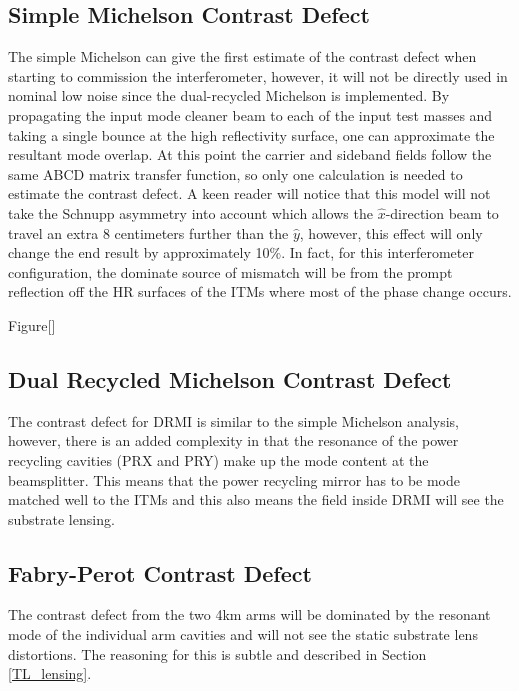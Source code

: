 	\subsection{Simple Michelson Contrast Defect}
	The simple Michelson can give the first estimate of the contrast defect when starting to commission the interferometer, however, it will not be directly used in nominal low noise since the dual-recycled Michelson is implemented.  
	By propagating the input mode cleaner beam to each of the input test masses and taking a single bounce at the high reflectivity surface, one can approximate the resultant mode overlap.  
	At this point the carrier and sideband fields follow the same ABCD matrix transfer function, so only one calculation is needed to estimate the contrast defect.  
	A keen reader will notice that this model will not take the Schnupp asymmetry into account which allows the $\hat{x}$-direction beam to travel an extra 8 centimeters further than the $\hat{y}$, however, this effect will only change the end result by approximately 10$\%$.
	In fact, for this interferometer configuration, the dominate source of mismatch will be from the prompt reflection off the HR surfaces of the ITMs where most of the phase change occurs.
	
	Figure[]
	
	
	\subsection{Dual Recycled Michelson Contrast Defect}
	The contrast defect for DRMI is similar to the simple Michelson analysis, however, there is an added complexity in that the resonance of the power recycling cavities (PRX and PRY) make up the mode content at the beamsplitter.
	This means that the power recycling mirror has to be mode matched well to the ITMs and this also means the field inside DRMI will see the substrate lensing.
	
	
	
	\subsection{Fabry-Perot Contrast Defect}
	The contrast defect from the two 4km arms will be dominated by the resonant mode of the individual arm cavities and will not see the static substrate lens distortions.
	The reasoning for this is subtle and described in Section \ref{TL_lensing}.
	
	

